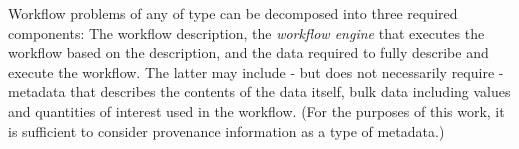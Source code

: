 Workflow problems of any of type can be decomposed into three required
components: The workflow description, the \textit{workflow engine} that
executes the workflow based on the description, and the data required to fully
describe and execute the workflow. The latter may include - but does not
necessarily require - metadata that describes the contents of the data itself,
bulk data including values and quantities of interest used in the workflow.
(For the purposes of this work, it is sufficient to consider provenance
information as a type of metadata.)

